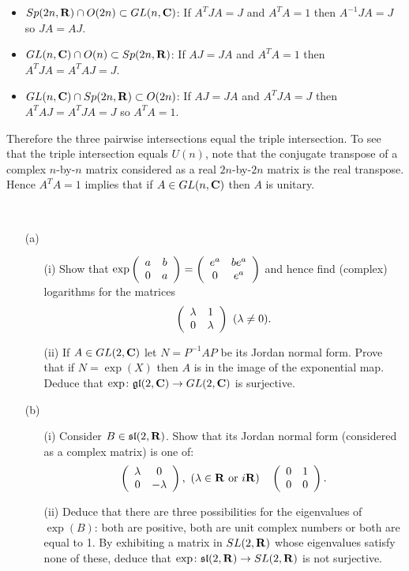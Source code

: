 \documentclass[12pt]{article}
\begin{document}
\begin{answer}
\begin{itemize}
\item $Sp(2n,\mathbf{R})\cap O(2n)\subset GL(n,\mathbf{C})$: If $A^TJA=J$ and $A^TA=1$ then $A^{-1}JA=J$ so $JA=AJ$.
\item $GL(n,\mathbf{C})\cap O(n)\subset Sp(2n,\mathbf{R})$: If $AJ=JA$ and $A^TA=1$ then $A^TJA=A^TAJ=J$.
\item $GL(n,\mathbf{C})\cap Sp(2n,\mathbf{R})\subset O(2n)$: If $AJ=JA$ and $A^TJA=J$ then $A^TAJ=A^TJA=J$ so $A^TA=1$.
\end{itemize}
Therefore the three pairwise intersections equal the triple intersection. To see that the triple intersection equals $U(n)$, note that the conjugate transpose of a complex $n$-by-$n$ matrix considered as a real $2n$-by-$2n$ matrix is the real transpose. Hence $A^TA=1$ implies that if $A\in GL(n,\mathbf{C})$ then $A$ is unitary.
\end{answer}
\newpage

\bigskip


\begin{question}\ \\
\begin{enumerate}
\item[(a)]
\begin{enumerate}
\item[(i)] Show that $\exp\left(\begin{array}{cc}a & b\\ 0 & a\end{array}\right)=\left(\begin{array}{cc}e^a & be^a\\ 0 & e^a\end{array}\right)$ and hence find (complex) logarithms for the matrices
\[\left(\begin{array}{cc}\lambda & 1\\ 0 & \lambda\end{array}\right)\ (\lambda\neq 0).\]
\item[(ii)] If $A\in GL(2,\mathbf{C})$ let $N=P^{-1}AP$ be its Jordan normal form. Prove that if $N=\exp(X)$ then $A$ is in the image of the exponential map. Deduce that $\exp\colon\mathfrak{gl}(2,\mathbf{C})\to GL(2,\mathbf{C})$ is surjective.
\end{enumerate}
\item[(b)]
\begin{enumerate}
\item[(i)] Consider $B\in \mathfrak{sl}(2,\mathbf{R})$. Show that its Jordan normal form (considered as a complex matrix) is one of:
\[\matr{\lambda}{0}{0}{-\lambda},\ (\lambda\in\RR\mbox{ or }i\RR)\quad\matr{0}{1}{0}{0}.\]
\item[(ii)] Deduce that there are three possibilities for the eigenvalues of $\exp(B)$: both are positive, both are unit complex numbers or both are equal to 1. By exhibiting a matrix in $SL(2,\mathbf{R})$ whose eigenvalues satisfy none of these, deduce that $\exp\colon\mathfrak{sl}(2,\mathbf{R})\to SL(2,\mathbf{R})$ is not surjective.
\end{enumerate}
\end{enumerate}
\end{question}
\end{document}
